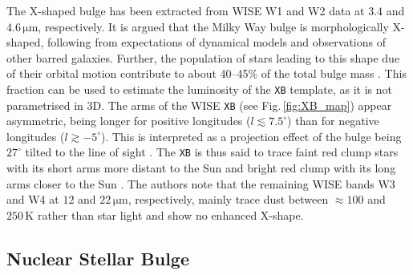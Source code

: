 \documentclass[doublespace,nopageskip]{VTthesis} %
\newcommand{\mrm}[1]{\mathrm{#1}}
\begin{document}
\begin{appendices}
	The X-shaped bulge \citep[\texttt{XB},][]{Ness2016_Xbulge_WISE} has been extracted from WISE W1 and W2 data at $3.4$ and $4.6\,\mrm{\mu m}$, respectively.
	It is argued that the Milky Way bulge is morphologically X-shaped, following from expectations of dynamical models and observations of other barred galaxies.
	Further, the population of stars leading to this shape due of their orbital motion contribute to about 40--45\% of the total bulge mass \citep{Portail2015_MilkyWayorbots_Xbulge}.
	This fraction can be used to estimate the luminosity of the \texttt{XB} template, as it is not parametrised in 3D.
	The arms of the WISE \texttt{XB} (see Fig.\,\ref{fig:XB_map}) appear asymmetric, being longer for positive longitudes ($l \lesssim 7.5^{\circ}$) than for negative longitudes ($l \gtrsim -5^{\circ}$).
	This is interpreted as a projection effect of the bulge being $27^{\circ}$ tilted to the line of sight \citep{Wegg2013_bulgebar}.
	The \texttt{XB} is thus said to trace faint red clump stars with its short arms more distant to the Sun and bright red clump with its long arms closer to the Sun \cite[][cf. discussion about the `double red clump' of the Milky Way]{Lee2018_DoubleRedClump}.
	The authors note that the remaining WISE bands W3 and W4 at $12$ and $22\,\mrm{\mu m}$, respectively, mainly trace dust between $\approx 100$ and $250\,\mrm{K}$ rather than star light and show no enhanced X-shape.
	
	
	\subsection{Nuclear Stellar Bulge}
	

\end{appendices}
\end{document}
